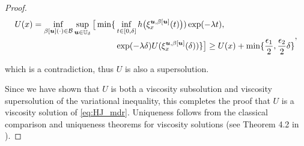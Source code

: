 \begin{for_journal}
\begin{proof}
\begin{equation} 
\begin{split}
U(x) = 
\inf_{\beta[\bm{u}](\cdot) \in \mathcal{B}} \sup_{\bm{u} \in \mathbb{U}_\delta} 
\big [\min\{ &\inf_{t \in [0, \delta]} h\big(\xi_{x}^{\bm{u},\beta[\bm{u}]}(t)\big))\exp(-\lambda  t), \\&\exp(-\lambda \delta)U(\xi_{x}^{\bm{u},\beta[\bm{u}]}(\delta))\}
\big ]\geq
U(x) + \min\{\frac{\epsilon_1}{2}, \frac{\epsilon_2}{2} \delta \}
\end{split},
\end{equation}
%

which is a contradiction, thus $U$ is also a supersolution.

Since we have shown that $U$ is both a viscosity subsolution and viscosity supersolution of the variational inequality, this completes the proof that $U$ is a viscosity solution of \eqref{eq:HJ_mdr}. Uniqueness follows from the classical comparison and uniqueness theorems for viscosity solutions (see Theorem 4.2 in \cite{Barron1989}).
\end{proof}
\end{for_journal}